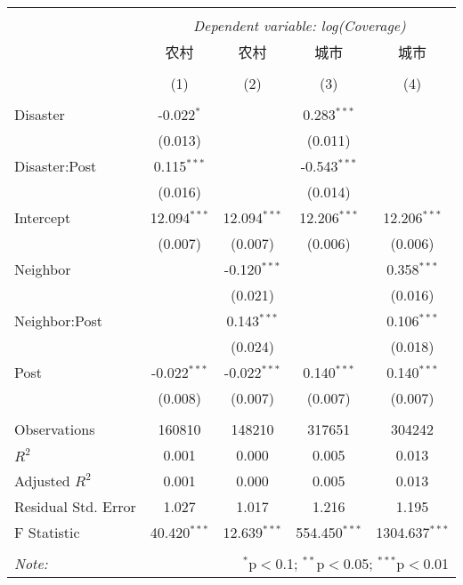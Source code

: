 
\begin{tabular}{@{\extracolsep{5pt}}lcccc}
\\[-1.8ex]\hline
\hline \\[-1.8ex]
& \multicolumn{4}{c}{\textit{Dependent variable: log(Coverage)}} \
\cr \cline{2-5}
\\[-1.8ex] & \multicolumn{1}{c}{农村} & \multicolumn{1}{c}{农村} & \multicolumn{1}{c}{城市} & \multicolumn{1}{c}{城市}  \\
\\[-1.8ex] & (1) & (2) & (3) & (4) \\
\hline \\[-1.8ex]
 Disaster & -0.022$^{*}$ & & 0.283$^{***}$ & \\
& (0.013) & & (0.011) & \\
 Disaster:Post & 0.115$^{***}$ & & -0.543$^{***}$ & \\
& (0.016) & & (0.014) & \\
 Intercept & 12.094$^{***}$ & 12.094$^{***}$ & 12.206$^{***}$ & 12.206$^{***}$ \\
& (0.007) & (0.007) & (0.006) & (0.006) \\
 Neighbor & & -0.120$^{***}$ & & 0.358$^{***}$ \\
& & (0.021) & & (0.016) \\
 Neighbor:Post & & 0.143$^{***}$ & & 0.106$^{***}$ \\
& & (0.024) & & (0.018) \\
 Post & -0.022$^{***}$ & -0.022$^{***}$ & 0.140$^{***}$ & 0.140$^{***}$ \\
& (0.008) & (0.007) & (0.007) & (0.007) \\
\hline \\[-1.8ex]
 Observations & 160810 & 148210 & 317651 & 304242 \\
 $R^2$ & 0.001 & 0.000 & 0.005 & 0.013 \\
 Adjusted $R^2$ & 0.001 & 0.000 & 0.005 & 0.013 \\
 Residual Std. Error & 1.027  & 1.017  & 1.216  & 1.195  \\
 F Statistic & 40.420$^{***}$  & 12.639$^{***}$  & 554.450$^{***}$  & 1304.637$^{***}$  \\
\hline
\hline \\[-1.8ex]
\textit{Note:} & \multicolumn{4}{r}{$^{*}$p$<$0.1; $^{**}$p$<$0.05; $^{***}$p$<$0.01} \\
\end{tabular}
